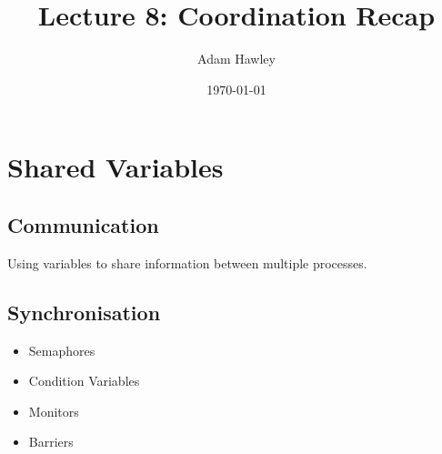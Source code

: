 \documentclass[11pt]{article}
\author{Adam Hawley}
\date{\today}
\title{Lecture 8: Coordination Recap}
\begin{document}
\maketitle
\tableofcontents


\section{Shared Variables}
\label{sec:org537843f}
\subsection{Communication}
\label{sec:org0cd1e6c}
Using variables to share information between multiple processes.

\subsection{Synchronisation}
\label{sec:orgcb3d49e}
\begin{itemize}
\item Semaphores
\item Condition Variables
\item Monitors
\item Barriers
\end{itemize}
\end{document}
